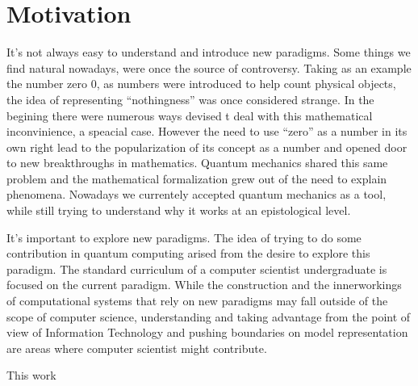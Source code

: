 \section{Motivation}
\label{sec:int_motivation}


It's not always easy to understand and introduce new paradigms. Some things we find natural nowadays, were once the source of controversy. Taking as an example the number zero $0$, as numbers were introduced to help count physical objects, the idea of representing ``nothingness'' was once considered strange. In the begining there were numerous ways devised t deal with this mathematical inconvinience, a speacial case. However the need to use ``zero'' as a number in its own right lead to the popularization of its concept as a number and opened door to new breakthroughs in mathematics. 
Quantum mechanics shared this same problem and the mathematical formalization grew out of the need to explain phenomena. Nowadays we currentely accepted quantum mechanics as a tool, while still trying to understand why it works at an epistological level.


It's important to explore new paradigms. The idea of trying to do some contribution in quantum computing arised from the desire to explore this paradigm. The standard curriculum of a computer scientist undergraduate is focused on the current paradigm. While the construction and the innerworkings of computational systems that rely on new paradigms may fall outside of the scope of computer science, understanding and taking advantage from the point of view of Information Technology and pushing boundaries on model representation are areas where computer scientist might contribute.

This work 
